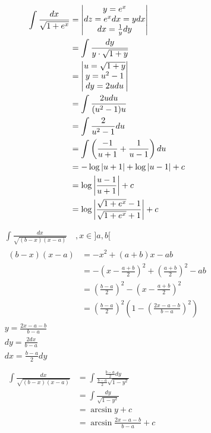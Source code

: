 \begin{bsp*}
	\begin{gather*}
		\begin{split}
			\int \frac{dx}{\sqrt{1+e^x}}	&= \begin{vmatrix}
										y = e^x \\
										dz = e^x dx = y dx \\
										dx = \frac{1}{y} dy
									\end{vmatrix} \\
								&= \int \frac{dy}{y \cdot \sqrt{1+y}} \\
								&= \begin{vmatrix}
										u = \sqrt{1+y} \\
										y = u^2 - 1 \\
										dy = 2u du
									\end{vmatrix} \\
								&= \int \frac{2u du}{(u^2-1)u} \\
								&= \int \frac{2}{u^2-1} du \\
								&= \int \left( \frac{-1}{u+1} + \frac{1}{u-1} \right) du \\
								&= -\log \abs{u+1} + \log\abs{u-1} + c \\
								&= \log\abs{\frac{u-1}{u+1}} + c \\
								&= \log\abs{\frac{\sqrt{1+e^x}-1}{\sqrt{1+e^x}+1}} + c
		\end{split}
	\end{gather*}
\end{bsp*}
\begin{bsp*}
	\begin{gather*}
		\int \frac{dx}{\sqrt{(b-x)(x-a)}} \quad , x \in ]a,b[ \\
		\begin{split}
			(b-x)(x-a)	&= -x^2 + (a+b) x - ab \\
					&= - \left( x - \frac{a+b}{2} \right)^2 + \left( \frac{a+b}{2} \right)^2 - ab \\
					&= \left( \frac{b-a}{2} \right)^2 - \left( x - \frac{a+b}{2} \right)^2 \\
					&= \left( \frac{b-a}{2} \right)^2 \left( 1 - \left( \frac{2x-a-b}{b-a} \right)^2 \right)
		\end{split} \\
		y = \frac{2x-a-b}{b-a} \\
		dy = \frac{2 dx}{b-a} \\
		dx = \frac{b-a}{2} dy \\
		\\
		\begin{split}
			\int \frac{dx}{\sqrt{(b-x)(x-a)}}	&= \int \frac{\frac{b-a}{2} dy}{\frac{b-a}{2} \sqrt{1-y^2}} \\
									&= \int \frac{dy}{\sqrt{1-y^2}} \\
									&= \arcsin y + c \\
									&= \arcsin \frac{2x-a-b}{b-a} + c
		\end{split}
	\end{gather*}
\end{bsp*}

